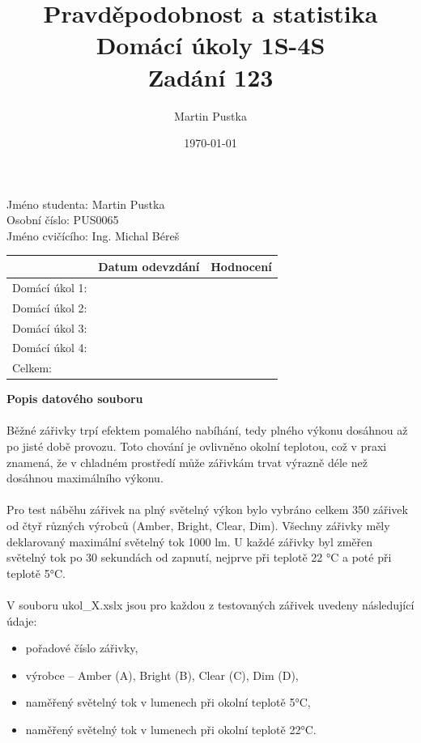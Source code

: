 \documentclass[czech]{article}%
\title{Pravděpodobnost a statistika\\
    \large Domácí úkoly 1S-4S\\
    \large Zadání 123}
\author{Martin Pustka}
\date{\today}
\begin{document}
\maketitle

\noindent
Jméno studenta: Martin Pustka\\
Osobní číslo: PUS0065\\
Jméno cvičícího: Ing. Michal Béreš\\

\begin{table}[!b]
    \centering
    \begin{tabular}{|l|p{5cm}|p{3cm}|}
        \hline
        & Datum odevzdání & Hodnocení \\
        \hline
        Domácí úkol 1: & & \\
        \hline
        Domácí úkol 2: & & \\
        \hline
        Domácí úkol 3: & & \\
        \hline
        Domácí úkol 4: & & \\
        \hline
        Celkem: & & \\
        \hline
    \end{tabular}
\end{table}
\newpage
\tableofcontents
\newpage

\noindent
\textbf{Popis datového souboru}
\\\\
\noindent
Běžné zářivky trpí efektem pomalého nabíhání, tedy plného výkonu dosáhnou až po jisté době provozu. Toto chování je ovlivněno okolní teplotou, což v praxi znamená, že v chladném prostředí může zářivkám trvat výrazně déle než dosáhnou maximálního výkonu. 
\\\\
\noindent
Pro test náběhu zářivek na plný světelný výkon bylo vybráno celkem 350 zářivek od čtyř různých výrobců (Amber, Bright, Clear, Dim). Všechny zářivky měly deklarovaný maximální světelný tok 1000 lm. U každé zářivky byl změřen světelný tok po 30 sekundách od zapnutí, nejprve při teplotě 22 °C a poté při teplotě 5°C.
\\\\
\noindent
V souboru ukol\_X.xslx jsou pro každou z testovaných zářivek uvedeny následující údaje:
\begin{itemize}
    \item pořadové číslo zářivky,
    \item výrobce – Amber (A), Bright (B), Clear (C), Dim (D),
    \item naměřený světelný tok v lumenech při okolní teplotě 5°C,
    \item naměřený světelný tok v lumenech při okolní teplotě 22°C.
\end{itemize}
\end{document}
